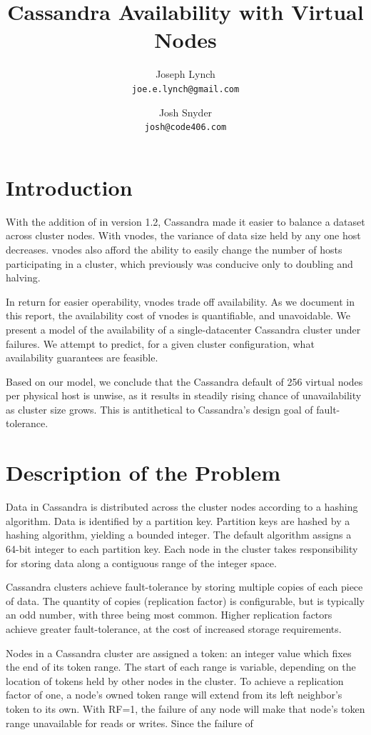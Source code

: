 \documentclass{article}
\title{Cassandra Availability with Virtual Nodes}
\author{
  Joseph Lynch\\
  \texttt{joe.e.lynch@gmail.com}
  \and
  Josh Snyder\\
  \texttt{josh@code406.com}
}
\begin{document}
\maketitle

\section{Introduction}
With the addition of  \cite{vnodes} in version 1.2, Cassandra made it easier to balance a dataset across cluster nodes. With vnodes, the variance of data size held by any one host decreases. vnodes also afford the ability to easily change the number of hosts participating in a cluster, which previously was conducive only to doubling and halving.

In return for easier operability, vnodes trade off availability. As we document in this report, the availability cost of vnodes is quantifiable, and unavoidable. We present a model of the availability of a single-datacenter Cassandra cluster under failures. We attempt to predict, for a given cluster configuration, what availability guarantees are feasible.

Based on our model, we conclude that the Cassandra default of 256 virtual nodes per physical host is unwise, as it results in steadily rising chance of unavailability as cluster size grows. This is antithetical to Cassandra's design goal of fault-tolerance.

\section{Description of the Problem}

Data in Cassandra is distributed across the cluster nodes according to a hashing algorithm. Data is identified by a partition key. Partition keys are hashed by a hashing algorithm, yielding a bounded integer. The default algorithm assigns a 64-bit integer to each partition key. Each node in the cluster takes responsibility for storing data along a contiguous range of the integer space.

Cassandra clusters achieve fault-tolerance by storing multiple copies of each piece of data. The quantity of copies (replication factor) is configurable, but is typically an odd number, with three being most common. Higher replication factors achieve greater fault-tolerance, at the cost of increased storage requirements.

Nodes in a Cassandra cluster are assigned a token: an integer value which fixes the end of its token range. The start of each range is variable, depending on the location of tokens held by other nodes in the cluster. To achieve a replication factor of one, a node's owned token range will extend from its left neighbor's token to its own. With RF=1, the failure of any node will make that node's token range unavailable for reads or writes. Since the failure of
\end{document}
